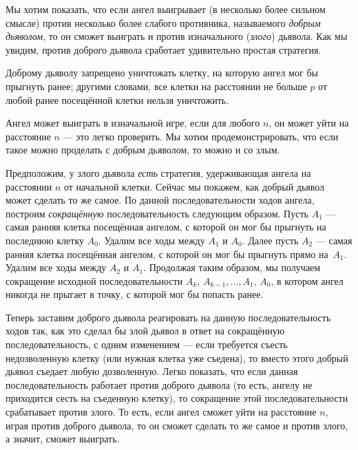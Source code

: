 Мы хотим показать, что если ангел выигрывает (в несколько более сильном смысле) против несколько более слабого противника, называемого \emph{добрым дьяволом}, то он сможет выиграть и против изначального (\emph{злого}) дьявола.
Как мы увидим, против доброго дьявола сработает удивительно простая стратегия.

Доброму дьяволу запрещено уничтожать клетку, на которую ангел мог бы прыгнуть ранее;
другими словами, все клетки на расстоянии не больше $p$ от любой ранее посещённой клетки нельзя уничтожить.

Ангел может выиграть в изначальной игре, если для любого $n$, он может уйти на расстояние $n$ ---
это легко проверить.
Мы хотим продемонстрировать, что если такое можно проделать с добрым дьяволом, то можно и со злым.

Предположим, у злого дьявола \emph{есть} стратегия, удерживающая ангела на расстоянии $n$ от начальной клетки.
Сейчас мы покажем, как добрый дьявол может сделать то же самое.
По данной последовательности ходов ангела, построим \emph{сокращённую} последовательность следующим образом.
Пусть $A_1$ --- самая ранняя клетка посещённая ангелом, с которой он мог бы прыгнуть на последнюю клетку $A_0$.
Удалим все ходы между $A_1$ и $A_0$.
Далее пусть $A_2$ --- самая ранняя клетка посещённая ангелом, с которой он мог бы прыгнуть прямо на~$A_1$.
Удалим все ходы между $A_2$ и $A_1$.
Продолжая таким образом, мы получаем сокращение исходной последовательности $A_k$, $A_{k-1}, \dots, A_1$, $A_0$, в котором ангел никогда не прыгает в точку, с которой мог бы попасть ранее.

Теперь заставим доброго дьявола реагировать на данную последовательность ходов так, как это сделал бы злой дьявол в ответ на сокращённую последовательность, с одним изменением --- если требуется съесть недозволенную клетку (или нужная клетка уже съедена), то вместо этого добрый дьявол съедает любую дозволенную.
Легко показать, что если данная последовательность работает против доброго дьявола (то есть, ангелу не приходится сесть на съеденную клетку), то сокращение этой последовательности срабатывает против злого.
То есть, если ангел сможет уйти на расстояние $n$, играя против доброго дьявола, то он сможет сделать то же самое и против злого, а значит, сможет выиграть.

